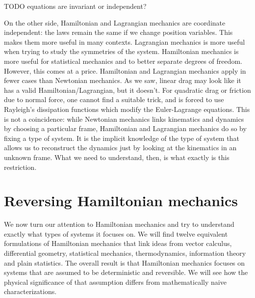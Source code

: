 TODO equations are invariant or independent?

On the other side, Hamiltonian and Lagrangian mechanics are coordinate independent: the laws remain the same if we change position variables. This makes them more useful in many contexts. Lagrangian mechanics is more useful when trying to study the symmetries of the system. Hamiltonian mechanics is more useful for statistical mechanics and to better separate degrees of freedom. However, this comes at a price. Hamiltonian and Lagrangian mechanics apply in fewer cases than Newtonian mechanics. As we saw, linear drag may look like it has a valid Hamiltonian/Lagrangian, but it doesn't. For quadratic drag or friction due to normal force, one cannot find a suitable trick, and is forced to use Rayleigh’s dissipation functions which modify the Euler-Lagrange equations. This is not a coincidence: while Newtonian mechanics links kinematics and dynamics by choosing a particular frame, Hamiltonian and Lagrangian mechanics do so by fixing a type of system. It is the implicit knowledge of the type of system that allows us to reconstruct the dynamics just by looking at the kinematics in an unknown frame. What we need to understand, then, is what exactly is this restriction.

\section{Reversing Hamiltonian mechanics}

We now turn our attention to Hamiltonian mechanics and try to understand exactly what types of systems it focuses on. We will find twelve equivalent formulations of Hamiltonian mechanics that link ideas from vector calculus, differential geometry, statistical mechanics, thermodynamics, information theory and plain statistics. The overall result is that Hamiltonian mechanics focuses on systems that are assumed to be deterministic and reversible. We will see how the physical significance of that assumption differs from mathematically naive characterizations.

